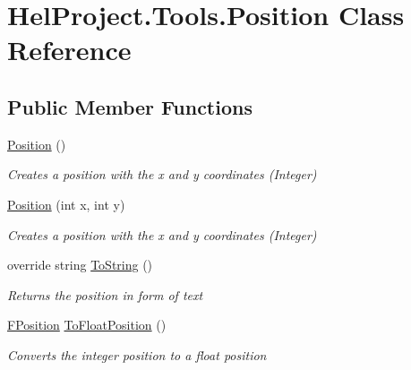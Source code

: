 \hypertarget{class_hel_project_1_1_tools_1_1_position}{}\section{Hel\+Project.\+Tools.\+Position Class Reference}
\label{class_hel_project_1_1_tools_1_1_position}
\subsection*{Public Member Functions}
\begin{DoxyCompactItemize}
\item 
\hyperlink{class_hel_project_1_1_tools_1_1_position_afdef860b24e022971fd468010b8e14cb}{Position} ()
\begin{DoxyCompactList}\small\item\em Creates a position with the x and y coordinates (Integer) \end{DoxyCompactList}\item 
\hyperlink{class_hel_project_1_1_tools_1_1_position_a38b5cf4192058d9750461e4d2b5862ac}{Position} (int x, int y)
\begin{DoxyCompactList}\small\item\em Creates a position with the x and y coordinates (Integer) \end{DoxyCompactList}\item 
override string \hyperlink{class_hel_project_1_1_tools_1_1_position_a6745f562915d6b46d7e208abd867cdad}{To\+String} ()
\begin{DoxyCompactList}\small\item\em Returns the position in form of text \end{DoxyCompactList}\item 
\hyperlink{class_hel_project_1_1_tools_1_1_f_position}{F\+Position} \hyperlink{class_hel_project_1_1_tools_1_1_position_a8cec365857b9f92698d2a34e86b87fe7}{To\+Float\+Position} ()
\begin{DoxyCompactList}\small\item\em Converts the integer position to a float position \end{DoxyCompactList}\end{DoxyCompactItemize}
